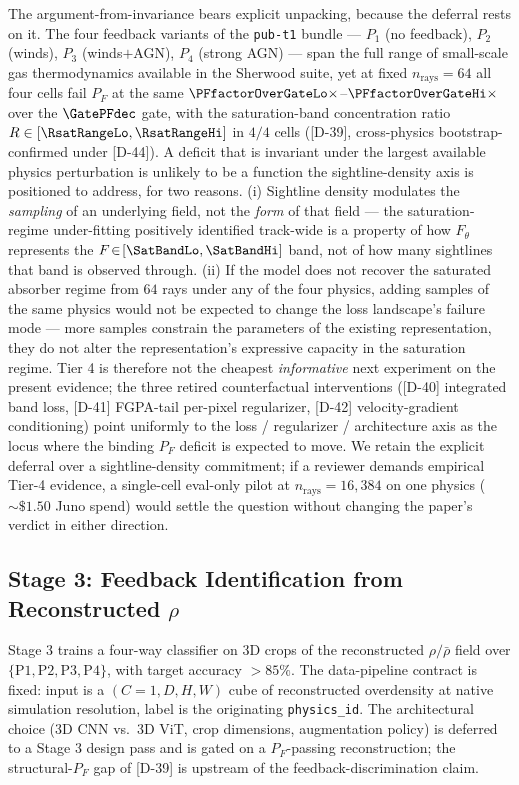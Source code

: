 The argument-from-invariance bears explicit unpacking, because the deferral rests on it. The four feedback variants of the \texttt{pub-t1} bundle --- $P_1$ (no feedback), $P_2$ (winds), $P_3$ (winds$+$AGN), $P_4$ (strong AGN) --- span the full range of small-scale gas thermodynamics available in the Sherwood suite, yet at fixed $n_{\text{rays}}=64$ all four cells fail $P_F$ at the same $\PFfactorOverGateLo\times$--$\PFfactorOverGateHi\times$ over the $\GatePFdec$ gate, with the saturation-band concentration ratio $R \in [\RsatRangeLo, \RsatRangeHi]$ in $4/4$ cells ([D-39], cross-physics bootstrap-confirmed under [D-44]). A deficit that is invariant under the largest available physics perturbation is unlikely to be a function the sightline-density axis is positioned to address, for two reasons. (i) Sightline density modulates the \emph{sampling} of an underlying field, not the \emph{form} of that field --- the saturation-regime under-fitting positively identified track-wide is a property of how $F_\theta$ represents the $F\!\in\![\SatBandLo, \SatBandHi]$ band, not of how many sightlines that band is observed through. (ii) If the model does not recover the saturated absorber regime from $64$ rays under any of the four physics, adding samples of the same physics would not be expected to change the loss landscape's failure mode --- more samples constrain the parameters of the existing representation, they do not alter the representation's expressive capacity in the saturation regime. Tier 4 is therefore not the cheapest \emph{informative} next experiment on the present evidence; the three retired counterfactual interventions ([D-40] integrated band loss, [D-41] FGPA-tail per-pixel regularizer, [D-42] velocity-gradient conditioning) point uniformly to the loss / regularizer / architecture axis as the locus where the binding $P_F$ deficit is expected to move. We retain the explicit deferral over a sightline-density commitment; if a reviewer demands empirical Tier-4 evidence, a single-cell eval-only pilot at $n_{\text{rays}}=16{,}384$ on one physics ($\sim\!\$1.50$ Juno spend) would settle the question without changing the paper's verdict in either direction.

\subsection{Stage 3: Feedback Identification from Reconstructed $\rho$}
\label{sec:nextsteps:stage3}
Stage 3 trains a four-way classifier on 3D crops of the reconstructed $\rho/\bar\rho$ field over $\{\text{P1}, \text{P2}, \text{P3}, \text{P4}\}$, with target accuracy $> 85\%$. The data-pipeline contract is fixed: input is a $(C{=}1, D, H, W)$ cube of reconstructed overdensity at native simulation resolution, label is the originating \texttt{physics\_id}. The architectural choice (3D CNN vs.\ 3D ViT, crop dimensions, augmentation policy) is deferred to a Stage 3 design pass and is gated on a $P_F$-passing reconstruction; the structural-$P_F$ gap of [D-39] is upstream of the feedback-discrimination claim.

